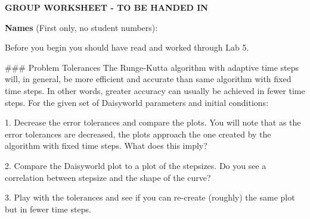 \documentclass[12pt]{article}
\begin{document}
{\bf GROUP WORKSHEET - TO BE HANDED IN}

{\bf Names} (First only, no student numbers):\\
\vspace{0.5in}

Before you begin you should have read and worked through Lab 5.

### Problem Tolerances
The Runge-Kutta algorithm with adaptive time steps will, in general, be more efficient and accurate than same
algorithm with fixed time steps. In other words, greater accuracy can usually be achieved in fewer time steps. For the given set of Daisyworld parameters and initial conditions:

1.  Decrease the error tolerances and compare the plots. You will note that as the error tolerances are decreased, the plots approach the one created by the algorithm with fixed time steps. What does this imply?

2.  Compare the Daisyworld plot to a plot of the stepsizes. Do you see a correlation between stepsize and the shape of the curve?

3.  Play with the tolerances and see if you can re-create (roughly) the same plot but in fewer time steps.
\end{document}
